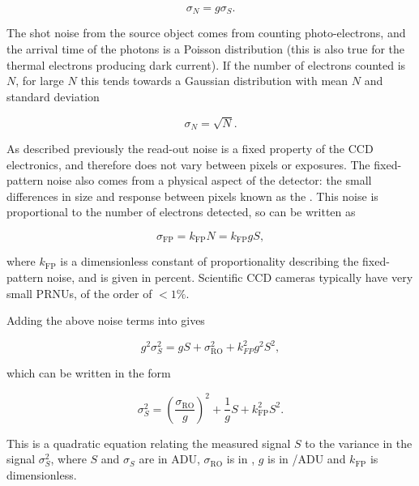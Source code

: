 \begin{colsection}
\begin{colsection}
\begin{equation}
    \sigma_N = g \sigma_S.
    \label{eq:noise_gain}
\end{equation}

The shot noise from the source object comes from counting photo-electrons, and the arrival time of the photons is a Poisson distribution (this is also true for the thermal electrons producing dark current). If the number of electrons counted is $N$, for large $N$ this tends towards a Gaussian distribution with mean $N$ and standard deviation

\begin{equation}
    \sigma_N = \sqrt{N}.
    \label{eq:shot_noise}
\end{equation}

As described previously the read-out noise is a fixed property of the CCD electronics, and therefore does not vary between pixels or exposures. The fixed-pattern noise also comes from a physical aspect of the detector: the small differences in size and response between pixels known as the . This noise is proportional to the number of electrons detected, so can be written as

\begin{equation}
    \sigma_\text{FP} = k_\text{FP}N = k_\text{FP}gS,
    \label{eq:fp_noise}
\end{equation}

where $k_\text{FP}$ is a dimensionless constant of proportionality describing the fixed-pattern noise, and is given in percent. Scientific CCD cameras typically have very small PRNUs, of the order of $<1\%$.

Adding the above noise terms into  gives

\begin{equation}
    g^2\sigma_S^2 = g S + \sigma_\text{RO}^2 + k_{FP}^2 g^2 S^2,
    \label{eq:ptc_noise2}
\end{equation}

which can be written in the form

\begin{equation}
    \sigma_S^2 = {\left(\frac{\sigma_\text{RO}}{g}\right)}^2 +
                 \frac{1}{g}S +
                 k_\text{FP}^2 S^2.
    \label{eq:ptc}
\end{equation}

This is a quadratic equation relating the measured signal $S$ to the variance in the signal $\sigma_S^2$, where $S$ and $\sigma_S$ are in ADU, $\sigma_\text{RO}$ is in \elec, $g$ is in \elec/ADU and $k_\text{FP}$ is dimensionless.


\end{colsection}
\end{colsection}
